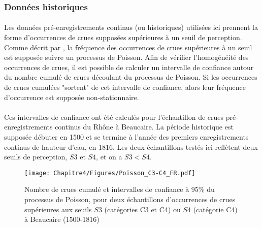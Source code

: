 
		
	\subsubsection{Données historiques}
	
	\paragraph{} Les données pré-enregistrements continus (ou historiques) utilisées ici prennent la forme d'occurrences de crues supposées supérieures à un seuil de perception. Comme décrit par \citet{lang_towards_1999}, la fréquence des occurrences de crues supérieures à un seuil est supposée suivre un processus de Poisson. Afin de vérifier l'homogénéité des occurrences de crues, il est possible de calculer un intervalle de confiance autour du nombre cumulé de crues découlant du processus de Poisson. Si les occurrences de crues cumulées "sortent" de cet intervalle de confiance, alors leur fréquence d'occurrence est supposée non-stationnaire. 
	
	\paragraph{} Ces intervalles de confiance ont été calculés pour l'échantillon de crues pré-enregistrements continus du Rhône à Beaucaire. La période historique est supposée débuter en 1500 et se termine à l'année des premiers enregistrements continus de hauteur d'eau, en 1816. Les deux échantillons testés ici reflètent deux seuils de perception, $S3$ et $S4$, et on a $S3 < S4$. 

	\begin{figure}[h]
		\centering
		\texttt{[image: Chapitre4/Figures/Poisson\_C3-C4\_FR.pdf]}	
		\caption{Nombre de crues cumulé et intervalles de confiance à 95\% du processus de 						Poisson, pour deux échantillons d'occurrences de crues supérieures aux seuils $S3$ (catégories C3 et C4) ou $S4$ (catégorie C4) à Beaucaire (1500-1816)}
		\label{fig:Poisson_C3-C4}
	\end{figure}		
	
